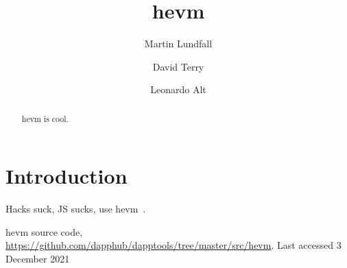 \documentclass[runningheads]{llncs}
\begin{document}
%
\title{hevm}
%
\author{Martin Lundfall \and
David Terry \and
Leonardo Alt}
%
%

%
\maketitle              %
%
\begin{abstract}
hevm is cool.

\end{abstract}
%
%
%
\section{Introduction}
Hacks suck, JS sucks, use hevm~\cite{hevm}.

%
%
%
% 
% 
%
\begin{thebibliography}{1}
hevm source code, \url{https://github.com/dapphub/dapptools/tree/master/src/hevm}.
Last accessed 3 December 2021
\end{thebibliography}
\end{document}
